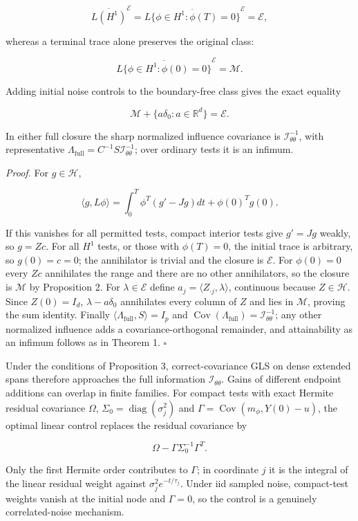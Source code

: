 \documentclass[
  american,
  11pt,
]{article}
\begin{document}
\[
\overline{L(H^1)}^{\mathcal E}
=\overline{L\{\phi\in H^1:\phi(T)=0\}}^{\mathcal E}
=\mathcal E,
\]

whereas a terminal trace alone preserves the original class:

\[
\overline{L\{\phi\in H^1:\phi(0)=0\}}^{\mathcal E}=\mathcal M.
\]

Adding initial noise controls to the boundary-free class gives the exact
equality

\[
\mathcal M+\{a\delta_0:a\in\mathbb R^d\}=\mathcal E.
\]

In either full closure the sharp normalized influence covariance is
\(\mathcal I_{\theta\theta}^{-1}\), with representative
\(\Lambda_{\mathrm{full}}=C^{-1}S\mathcal I_{\theta\theta}^{-1}\); over
ordinary tests it is an infimum.

\emph{Proof.} For \(g\in\mathcal H\),

\[
\langle g,L\phi\rangle
=\int_0^T\phi^T(g'-Jg)dt+\phi(0)^Tg(0).
\]

If this vanishes for all permitted tests, compact interior tests give
\(g'=Jg\) weakly, so \(g=Zc\). For all \(H^1\) tests, or those with
\(\phi(T)=0\), the initial trace is arbitrary, so \(g(0)=c=0\); the
annihilator is trivial and the closure is \(\mathcal E\). For
\(\phi(0)=0\) every \(Zc\) annihilates the range and there are no other
annihilators, so the closure is \(\mathcal M\) by Proposition 2. For
\(\lambda\in\mathcal E\) define
\(a_j=\langle Z_{\cdot j},\lambda\rangle\), continuous because
\(Z\in\mathcal H\). Since \(Z(0)=I_d\), \(\lambda-a\delta_0\)
annihilates every column of \(Z\) and lies in \(\mathcal M\), proving
the sum identity. Finally
\(\langle\Lambda_{\mathrm{full}},S\rangle=I_p\) and
\(\operatorname{Cov}(\Lambda_{\mathrm{full}})=\mathcal I_{\theta\theta}^{-1}\);
any other normalized influence adds a covariance-orthogonal remainder,
and attainability as an infimum follows as in Theorem 1. \(\square\)

Under the conditions of Proposition 3, correct-covariance GLS on dense
extended spans therefore approaches the full information
\(\mathcal I_{\theta\theta}\). Gains of different endpoint additions can
overlap in finite families. For compact tests with exact Hermite
residual covariance \(\Omega\),
\(\Sigma_0=\operatorname{diag}(\sigma_j^2)\) and
\(\Gamma=\operatorname{Cov}(m_\phi,Y(0)-u)\), the optimal linear control
replaces the residual covariance by

\[
\Omega-\Gamma\Sigma_0^{-1}\Gamma^T.
\]

Only the first Hermite order contributes to \(\Gamma\); in coordinate
\(j\) it is the integral of the linear residual weight against
\(\sigma_j^2e^{-t/\tau_j}\). Under iid sampled noise, compact-test
weights vanish at the initial node and \(\Gamma=0\), so the control is a
genuinely correlated-noise mechanism.
\end{document}
